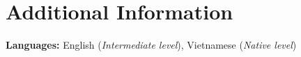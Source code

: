\section{\textbf{Additional Information}}
\vspace{-0.4mm}
\vspace{0.5mm}
\textbf{Languages:} English (\textit{Intermediate level}), Vietnamese (\textit{Native level}) \\
\vspace{-6mm}